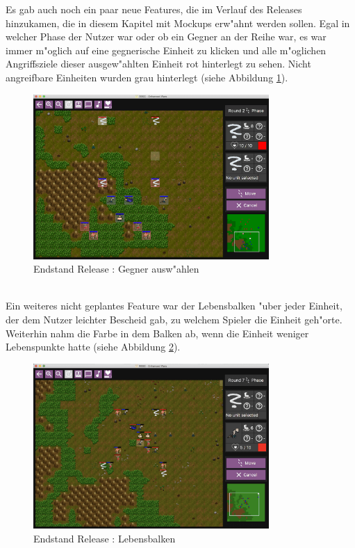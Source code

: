 \documentclass[12pt, titlepage]{scrartcl}
\newcommand{\RN}[1]{%
	\textup{\uppercase\expandafter{\romannumeral#1}}%
}
\newcounter{subsubsubsection}[subsubsection]
\begin{document}
					Es gab auch noch ein paar neue Features, die im Verlauf des Releases \RN{3} hinzukamen, die in diesem Kapitel mit Mockups erw"ahnt werden sollen.
					\vspace{0.3cm} \newline
					Egal in welcher Phase der Nutzer war oder ob ein Gegner an der Reihe war, es war immer m"oglich auf eine gegnerische Einheit zu klicken und alle m"oglichen Angriffsziele dieser ausgew"ahlten Einheit rot hinterlegt zu sehen. Nicht angreifbare Einheiten wurden grau hinterlegt (siehe Abbildung \ref{End_Select_Enemy}).
					\begin{figure}[H] 
						\centering
						\includegraphics[width=0.8\textwidth]{images/endOfRelease/SelectEnemy.png}
						\caption{Endstand Release \RN{3}: Gegner ausw"ahlen}
						\label{End_Select_Enemy}
					\end{figure}
					\ \\ Ein weiteres nicht geplantes Feature war der Lebensbalken "uber jeder Einheit, der dem Nutzer leichter Bescheid gab, zu welchem Spieler die Einheit geh"orte. Weiterhin nahm die Farbe in dem Balken ab, wenn die Einheit weniger Lebenspunkte hatte (siehe Abbildung \ref{End_Healthbar_Down}).
					\begin{figure}[H] 
						\centering
						\includegraphics[width=0.8\textwidth]{images/endOfRelease/HealthbarDown.png}
						\caption{Endstand Release \RN{3}: Lebensbalken}
						\label{End_Healthbar_Down}
					\end{figure}
\end{document}

